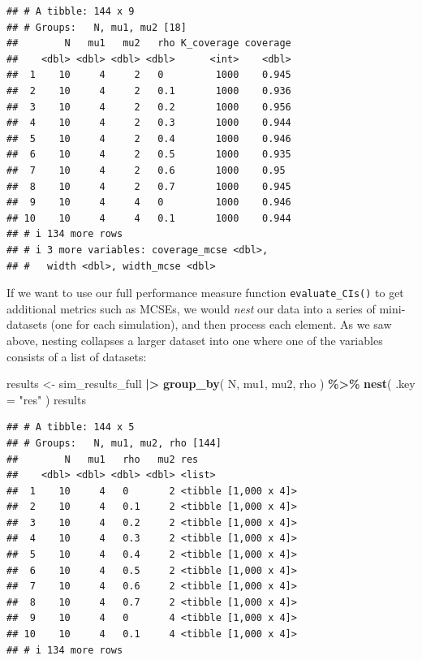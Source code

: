 \documentclass[
]{book}
\newenvironment{Shaded}{\begin{snugshade}}{\end{snugshade}}
\newcommand{\AttributeTok}[1]{\textcolor[rgb]{0.13,0.29,0.53}{#1}}
\newcommand{\FunctionTok}[1]{\textcolor[rgb]{0.13,0.29,0.53}{\textbf{#1}}}
\newcommand{\NormalTok}[1]{#1}
\newcommand{\OtherTok}[1]{\textcolor[rgb]{0.56,0.35,0.01}{#1}}
\newcommand{\SpecialCharTok}[1]{\textcolor[rgb]{0.81,0.36,0.00}{\textbf{#1}}}
\newcommand{\StringTok}[1]{\textcolor[rgb]{0.31,0.60,0.02}{#1}}
\begin{document}
\begin{verbatim}
## # A tibble: 144 x 9
## # Groups:   N, mu1, mu2 [18]
##        N   mu1   mu2   rho K_coverage coverage
##    <dbl> <dbl> <dbl> <dbl>      <int>    <dbl>
##  1    10     4     2   0         1000    0.945
##  2    10     4     2   0.1       1000    0.936
##  3    10     4     2   0.2       1000    0.956
##  4    10     4     2   0.3       1000    0.944
##  5    10     4     2   0.4       1000    0.946
##  6    10     4     2   0.5       1000    0.935
##  7    10     4     2   0.6       1000    0.95 
##  8    10     4     2   0.7       1000    0.945
##  9    10     4     4   0         1000    0.946
## 10    10     4     4   0.1       1000    0.944
## # i 134 more rows
## # i 3 more variables: coverage_mcse <dbl>,
## #   width <dbl>, width_mcse <dbl>
\end{verbatim}

If we want to use our full performance measure function \texttt{evaluate\_CIs()} to get additional metrics such as MCSEs, we would \emph{nest} our data into a series of mini-datasets (one for each simulation), and then process each element.
As we saw above, nesting collapses a larger dataset into one where one of the variables consists of a list of datasets:

\begin{Shaded}
\begin{Highlighting}[]
\NormalTok{results }\OtherTok{\textless{}{-}} 
\NormalTok{  sim\_results\_full }\SpecialCharTok{|\textgreater{}}
  \FunctionTok{group\_by}\NormalTok{( N, mu1, mu2, rho ) }\SpecialCharTok{\%\textgreater{}\%}
  \FunctionTok{nest}\NormalTok{( }\AttributeTok{.key =} \StringTok{"res"}\NormalTok{ )}
\NormalTok{results}
\end{Highlighting}
\end{Shaded}

\begin{verbatim}
## # A tibble: 144 x 5
## # Groups:   N, mu1, mu2, rho [144]
##        N   mu1   rho   mu2 res                 
##    <dbl> <dbl> <dbl> <dbl> <list>              
##  1    10     4   0       2 <tibble [1,000 x 4]>
##  2    10     4   0.1     2 <tibble [1,000 x 4]>
##  3    10     4   0.2     2 <tibble [1,000 x 4]>
##  4    10     4   0.3     2 <tibble [1,000 x 4]>
##  5    10     4   0.4     2 <tibble [1,000 x 4]>
##  6    10     4   0.5     2 <tibble [1,000 x 4]>
##  7    10     4   0.6     2 <tibble [1,000 x 4]>
##  8    10     4   0.7     2 <tibble [1,000 x 4]>
##  9    10     4   0       4 <tibble [1,000 x 4]>
## 10    10     4   0.1     4 <tibble [1,000 x 4]>
## # i 134 more rows
\end{verbatim}
\end{document}
